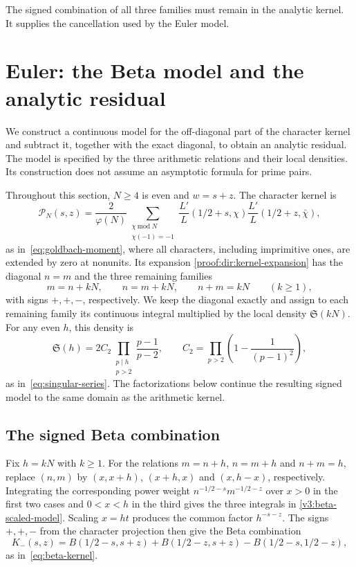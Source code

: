 \documentclass[12pt,a4paper]{amsart}
\numberwithin{equation}{section}
\def\ge{\geqslant}
\theoremstyle{plain}
\theoremstyle{definition}
\theoremstyle{remark}
\begin{document}
The signed combination of all three families must remain
in the analytic kernel. It supplies the cancellation used by the Euler model.

\section{Euler: the Beta model and the analytic residual}
\label{proof:sec:beta-mellin}\label{proof:v7:euler}

We construct a continuous model for the off-diagonal part of the
character kernel and subtract it, together with the exact diagonal,
to obtain an analytic residual. The model is specified by the
three arithmetic relations and their local densities. Its
construction does not assume an asymptotic formula for prime pairs.

Throughout this section, $N\ge4$ is even and $w=s+z$.
The character kernel is
\[
 \mathscr P_N(s,z)=\frac2{\varphi(N)}
 \sum_{\substack{\chi\ \mathrm{mod}\ N\\\chi(-1)=-1}}
 \frac{L'}L(1/2+s,\chi)\frac{L'}L(1/2+z,\bar\chi),
\]
as in~\eqref{eq:goldbach-moment},
where all characters, including imprimitive ones, are extended
by zero at nonunits. Its expansion
\eqref{proof:dir:kernel-expansion} has the diagonal $n=m$ and
the three remaining families
\[
 m=n+kN,\qquad n=m+kN,\qquad n+m=kN\qquad(k\ge1),
\]
with signs $+,+,-$, respectively. We keep the diagonal exactly and
assign to each remaining family its continuous integral multiplied
by the local density $\mathfrak S(kN)$. For any even $h$, this density is
\[
 \mathfrak S(h)=2C_2\prod_{\substack{p\mid h\\p>2}}\frac{p-1}{p-2},
 \qquad C_2=\prod_{p>2}\left(1-\frac1{(p-1)^2}\right),
\]
as in~\eqref{eq:singular-series}.
The factorizations below continue the resulting signed model to
the same domain as the arithmetic kernel.

\subsection{The signed Beta combination}
\label{proof:v7:signed-beta-model}

Fix $h=kN$ with $k\ge1$. For the relations $m=n+h$, $n=m+h$
and $n+m=h$, replace $(n,m)$ by $(x,x+h)$, $(x+h,x)$ and
$(x,h-x)$, respectively. Integrating the corresponding power weight
$n^{-1/2-s}m^{-1/2-z}$ over $x>0$ in the first two cases and
$0<x<h$ in the third gives the three integrals in
\eqref{v3:beta-scaled-model}. Scaling $x=ht$ produces the common
factor $h^{-s-z}$. The signs $+,+,-$ from the character projection
then give the Beta combination
\[
 K_-(s,z)=B(1/2-s,s+z)+B(1/2-z,s+z)
                         -B(1/2-s,1/2-z),
\]
as in~\eqref{eq:beta-kernel}.
\end{document}
